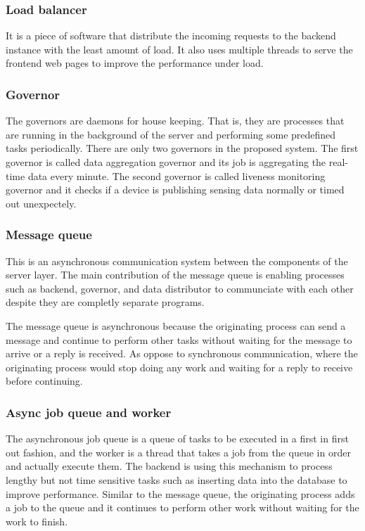\documentclass[../thesis.tex]{subfiles}
\begin{document}
\subsubsection{Load balancer}

It is a piece of software that distribute the incoming requests to the backend instance with the least amount of load. It also uses multiple threads to serve the frontend web pages to improve the performance under load.

\subsubsection{Governor}

The governors are daemons for house keeping. That is, they are processes that are running in the background of the server and performing some predefined tasks periodically. There are only two governors in the proposed system. The first governor is called data aggregation governor and its job is aggregating the real-time data every minute. The second governor is called liveness monitoring governor and it checks if a device is publishing sensing data normally or timed out unexpectely. 

\subsubsection{Message queue}

This is an asynchronous communication system between the components of the server layer. The main contribution of the message queue is enabling processes such as backend, governor, and data distributor to communciate with each other despite they are completly separate programs. 

The message queue is asynchronous because the originating process can send a message and continue to perform other tasks without waiting for the message to arrive or a reply is received. As oppose to synchronous communication, where the originating process would stop doing any work and waiting for a reply to receive before continuing.

\subsubsection{Async job queue and worker}

The asynchronous job queue is a queue of tasks to be executed in a first in first out fashion, and the worker is a thread that takes a job from the queue in order and actually execute them. The backend is using this mechanism to process lengthy but not time sensitive tasks such as inserting data into the database to improve performance. Similar to the message queue, the originating process adds a job to the queue and it continues to perform other work without waiting for the work to finish. 
\end{document}
